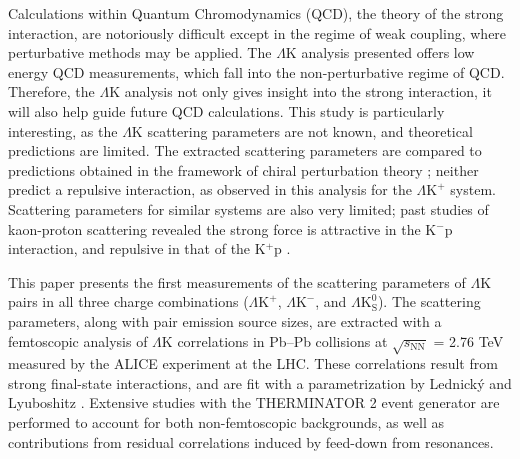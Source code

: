 \documentclass[ALICE,manyauthors]{cernphprep}
\newcommand{\LamK}{$\Lambda$K\xspace}
\newcommand{\LamKchP}{$\Lambda\mathrm{K^{+}}$\xspace}
\newcommand{\LamKchM}{$\Lambda\mathrm{K^{-}}$\xspace}
\newcommand{\LamKs}{$\Lambda\mathrm{K^{0}_{S}}$\xspace}
\begin{document}
Calculations within Quantum Chromodynamics (QCD), the theory of the strong interaction, are notoriously difficult except in the regime of weak coupling, where perturbative methods may be applied. 
The \LamK analysis presented offers low energy QCD measurements, which fall into the non-perturbative regime of QCD.
Therefore, the \LamK analysis not only gives insight into the strong interaction, it will also help guide future QCD calculations.
This study is particularly interesting, as the \LamK scattering parameters are not known, and theoretical predictions are limited.
The extracted scattering parameters are compared to predictions obtained in the framework of chiral perturbation theory \cite{Liu:2006xja,Mai:2009ce}; neither predict a repulsive interaction, as observed in this analysis for the \LamKchP system.
Scattering parameters for similar systems are also very limited; past studies of kaon-proton scattering revealed the strong force is attractive in the K$^{-}$p interaction, and repulsive in that of the K$^{+}$p \cite{Humphrey:1962zz, Hadjimichef:2002xe, Ikeda:2012au}.

This paper presents the first measurements of the scattering parameters of \LamK pairs in all three charge combinations (\LamKchP, \LamKchM, and \LamKs).
The scattering parameters, along with pair emission source sizes, are extracted with a femtoscopic analysis of \LamK correlations in Pb--Pb collisions at $\sqrt{s_{\mathrm{NN}}}$ = 2.76 TeV measured by the ALICE experiment at the LHC.  
These correlations result from strong final-state interactions, and are fit with a parametrization by Lednick\'y and Lyuboshitz \cite{Lednicky:82}.  
Extensive studies with the THERMINATOR 2 event generator are performed to account for both non-femtoscopic backgrounds, as well as contributions from residual correlations induced by feed-down from resonances.
\end{document}
